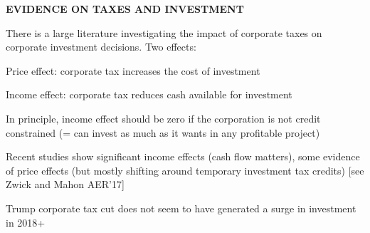 \documentclass[landscape]{slides}
\begin{document}
%

\begin{slide}
\begin{center}
{\bf EVIDENCE ON TAXES AND INVESTMENT}
\end{center}

There is a large literature investigating the impact of corporate taxes on corporate investment decisions.
Two effects:

Price effect: corporate tax increases the cost of investment

Income effect: corporate tax reduces cash available for investment

In principle, income effect should be zero if the corporation is not credit constrained
(= can invest as much as it wants in any profitable project)

Recent studies show significant income effects (cash flow matters), some evidence of price effects
(but mostly shifting around temporary investment tax credits) [see Zwick and Mahon AER'17]

Trump corporate tax cut does not seem to have generated a surge in investment in 2018+ 

\end{slide}

\begin{slide}

\end{slide}
%
%
%
%
%
%
%
%
%
%
%
%
\end{document}
